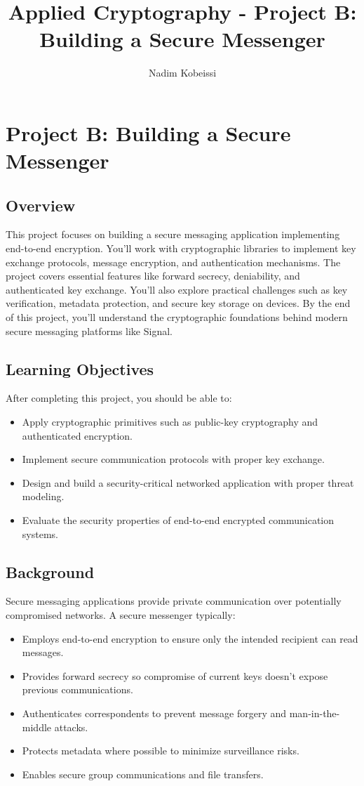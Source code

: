 \documentclass[10pt,a4paper,american]{exam}
\title{Applied Cryptography - Project B: Building a Secure Messenger}
\author{Nadim Kobeissi}
\begin{document}
\classhandoutheader
\section*{Project B: Building a Secure Messenger}

\subsection*{Overview}
This project focuses on building a secure messaging application implementing end-to-end encryption. You'll work with cryptographic libraries to implement key exchange protocols, message encryption, and authentication mechanisms. The project covers essential features like forward secrecy, deniability, and authenticated key exchange. You'll also explore practical challenges such as key verification, metadata protection, and secure key storage on devices. By the end of this project, you'll understand the cryptographic foundations behind modern secure messaging platforms like Signal.

\subsection*{Learning Objectives}
After completing this project, you should be able to:
\begin{itemize}
	\item Apply cryptographic primitives such as public-key cryptography and authenticated encryption.
	\item Implement secure communication protocols with proper key exchange.
	\item Design and build a security-critical networked application with proper threat modeling.
	\item Evaluate the security properties of end-to-end encrypted communication systems.
\end{itemize}

\subsection*{Background}
Secure messaging applications provide private communication over potentially compromised networks. A secure messenger typically:
\begin{itemize}
	\item Employs end-to-end encryption to ensure only the intended recipient can read messages.
	\item Provides forward secrecy so compromise of current keys doesn't expose previous communications.
	\item Authenticates correspondents to prevent message forgery and man-in-the-middle attacks.
	\item Protects metadata where possible to minimize surveillance risks.
	\item Enables secure group communications and file transfers.
\end{itemize}
\end{document}
